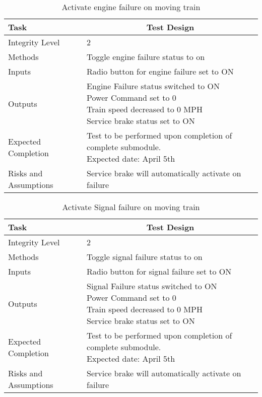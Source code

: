 \documentclass[]{article}
\begin{document}
	\begin{table}[H]
		\centering
		\caption{Activate engine failure on moving train}
		\begin{tabular}{|l|l|}
			\hline
			Task & \multicolumn{1}{c|}{Test Design} \\ \hline
			Integrity Level & 2 \\ \hline
			Methods & Toggle engine failure status to on  \\ \hline
			Inputs &  Radio button for engine failure set to ON \\ \hline
			Outputs & \parbox[t]{10cm}{ Engine Failure status switched to ON\\ Power Command set to 0\\ Train speed decreased to 0 MPH\\ Service brake status set to ON  }\\ \hline
			Expected Completion & \parbox[t]{10cm}{Test to be performed upon completion of complete submodule.\\ Expected date: April 5th}\\ \hline
			Risks and Assumptions & Service brake will automatically activate on failure\\ \hline
		\end{tabular}
	\end{table}

	\begin{table}[H]
		\centering
		\caption{Activate Signal failure on moving train}
		\begin{tabular}{|l|l|}
			\hline
			Task & \multicolumn{1}{c|}{Test Design} \\ \hline
			Integrity Level & 2 \\ \hline
			Methods & Toggle signal failure status to on  \\ \hline
			Inputs &  Radio button for signal failure set to ON \\ \hline
			Outputs & \parbox[t]{10cm}{ Signal Failure status switched to ON\\ Power Command set to 0\\ Train speed decreased to 0 MPH\\ Service brake status set to ON  }\\ \hline
			Expected Completion & \parbox[t]{10cm}{Test to be performed upon completion of complete submodule.\\ Expected date: April 5th}\\ \hline
			Risks and Assumptions & Service brake will automatically activate on failure\\ \hline
		\end{tabular}
	\end{table}
\end{document}
